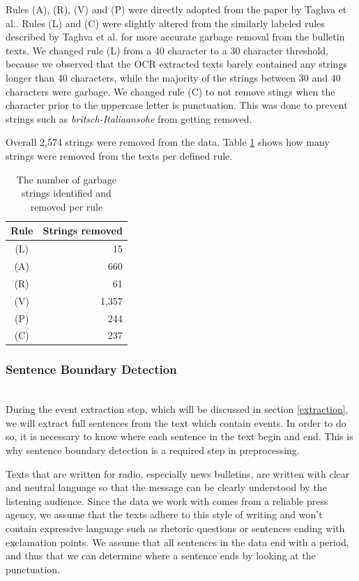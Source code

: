 \documentclass[a4paper, 10pt, conference]{ieeeconf}      %
\begin{document}
Rules (A), (R), (V) and (P) were directly adopted from the paper by Taghva et al.\cite{taghva2001automatic}. Rules (L) and (C) were slightly altered from the similarly labeled rules described by Taghva et al. for more accurate garbage removal from the bulletin texts. We changed rule (L) from a 40 character to a 30 character threshold, because we observed that the OCR extracted texts barely contained any strings longer than 40 characters, while the majority of the strings between 30 and 40 characters were garbage. We changed rule (C) to not remove stings when the character prior to the uppercase letter is punctuation. This was done to prevent strings such as \textit{britsch-Italiaansohe} from getting removed.

Overall 2,574 strings were removed from the data. Table \ref{garbage removed per rule} shows how many strings were removed from the texts per defined rule.


\begin{table}
  \begin{center}
    \begin{tabular}{c|r}
    Rule & Strings removed\\
    \hline
    (L) & 15\\
    (A) & 660\\
    (R) & 61\\
    (V) & 1,357\\
    (P) & 244\\
    (C) & 237\\
    \end{tabular}
  \end{center}
  \caption{The number of garbage strings identified and removed per rule}
  \label{garbage removed per rule}
\end{table}

\subsubsection{Sentence Boundary Detection}\label{sbd}~\\
During the event extraction step, which will be discussed in section \ref{extraction}, we will extract full sentences from the text which contain events. In order to do so, it is necessary to know where each sentence in the text begin and end. This is why sentence boundary detection is a required step in preprocessing.

Texts that are written for radio, especially news bulletins, are written with clear and neutral language so that the message can be clearly understood by the listening audience\cite{pelgrims2005journalistieke}. Since the data we work with comes from a reliable press agency, we assume that the texts adhere to this style of writing and won't contain expressive language such as rhetoric questions or sentences ending with exclamation points. We assume that all sentences in the data end with a period, and thus that we can determine where a sentence ends by looking at the punctuation.
\end{document}
